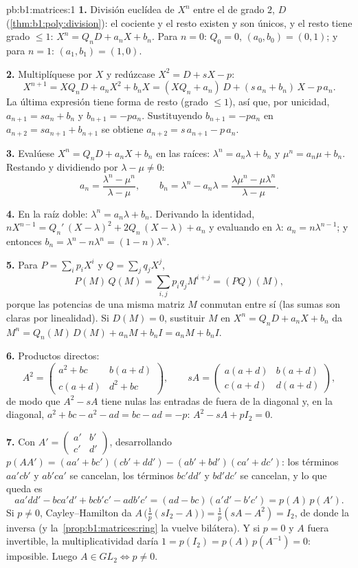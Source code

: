 \begin{solution}{pb:b1:matrices:1}
\textbf{1.} División euclídea de $X^n$ entre el 
de grado $2$, $D$ (\cref{thm:b1:poly:division}): el cociente y el resto
existen y son únicos, y el resto tiene grado $\leq 1$:
$X^n = Q_n D + a_n X + b_n$. Para $n = 0$: $Q_0 = 0$,
$(a_0, b_0) = (0, 1)$; y para $n = 1$: $(a_1, b_1) = (1, 0)$.

\textbf{2.} Multiplíquese por $X$ y redúzcase $X^2 = D + sX - p$:
\[
X^{n+1} = X Q_n D + a_n X^2 + b_n X
= (X Q_n + a_n)\,D + (s\,a_n + b_n)\,X - p\,a_n .
\]
La última expresión tiene forma de resto (grado $\leq 1$), así que,
por unicidad, $a_{n+1} = s a_n + b_n$ y $b_{n+1} = -p a_n$.
Sustituyendo $b_{n+1} = -pa_n$ en $a_{n+2} = s a_{n+1} + b_{n+1}$ se
obtiene $a_{n+2} = s\,a_{n+1} - p\,a_n$.

\textbf{3.} Evalúese $X^n = Q_n D + a_n X + b_n$ en las raíces:
$\lambda^n = a_n\lambda + b_n$ y $\mu^n = a_n\mu + b_n$. Restando y
dividiendo por $\lambda - \mu \neq 0$:
\[
a_n = \frac{\lambda^n - \mu^n}{\lambda - \mu},
\qquad
b_n = \lambda^n - a_n\lambda
= \frac{\lambda\mu^n - \mu\lambda^n}{\lambda - \mu} .
\]

\textbf{4.} En la raíz doble: $\lambda^n = a_n\lambda + b_n$.
Derivando la identidad,
$nX^{n-1} = Q_n'\,(X - \lambda)^2 + 2Q_n\,(X - \lambda) + a_n$ y
evaluando en $\lambda$: $a_n = n\lambda^{n-1}$; y entonces
$b_n = \lambda^n - n\lambda^{n} = (1 - n)\lambda^{n}$.

\textbf{5.} Para $P = \sum_i p_i X^i$ y $Q = \sum_j q_j X^j$,
\[
P(M)\,Q(M) = \sum_{i,j} p_i q_j M^{i+j} = (PQ)(M),
\]
porque las potencias de una misma matriz $M$ conmutan entre sí (las
sumas son claras por linealidad). Si $D(M) = 0$, sustituir $M$ en
$X^n = Q_n D + a_n X + b_n$ da
$M^n = Q_n(M)\,D(M) + a_n M + b_n I = a_n M + b_n I$.

\textbf{6.} Productos directos:
\[
A^2 = \begin{pmatrix}
a^2 + bc & b(a + d)\\
c(a + d) & d^2 + bc
\end{pmatrix},
\qquad
s A = \begin{pmatrix}
a(a+d) & b(a+d)\\
c(a+d) & d(a+d)
\end{pmatrix},
\]
de modo que $A^2 - sA$ tiene nulas las entradas de fuera de la
diagonal y, en la diagonal, $a^2 + bc - a^2 - ad = bc - ad = -p$:
$A^2 - sA + pI_2 = 0$.

\textbf{7.} Con
$A' = \begin{pmatrix} a' & b'\\ c' & d'\end{pmatrix}$, desarrollando
$p(AA') = (aa' + bc')(cb' + dd') - (ab' + bd')(ca' + dc')$: los
términos $aa'cb'$ y $ab'ca'$ se cancelan, los términos $bc'dd'$ y
$bd'dc'$ se cancelan, y lo que queda es
\[
aa'dd' - bca'd' + bcb'c' - adb'c'
= (ad - bc)(a'd' - b'c') = p(A)\,p(A').
\]
Si $p \neq 0$, Cayley--Hamilton da
$A\,\bigl(\tfrac1p(sI_2 - A)\bigr) = \tfrac1p(sA - A^2) = I_2$, de
donde la inversa (y la~\cref{prop:b1:matrices:ring} la vuelve
bilátera). Y si $p = 0$ y $A$ fuera invertible, la multiplicatividad
daría $1 = p(I_2) = p(A)\,p(A^{-1}) = 0$: imposible. Luego
$A \in GL_2 \iff p \neq 0$.


\end{solution}
